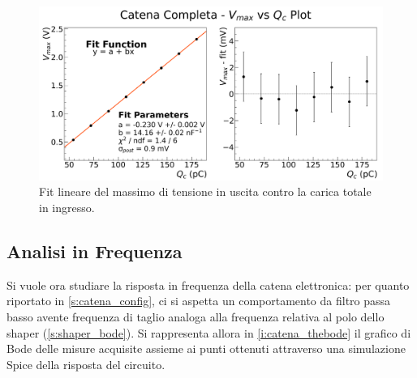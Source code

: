 \documentclass[a4paper,11pt]{article} %
\begin{document}
\begin{figure}[H] 
	\centering 
	\includegraphics[width=0.8\linewidth]{../Plots/Catena/catena_linearity2.png}
	\vspace{-10pt}
	\caption{\small Fit lineare del massimo di tensione in uscita contro la carica totale in ingresso.}
	\label{i:catena_linearity} 
\end{figure} 
\vspace{-7pt}


\subsection{Analisi in Frequenza}\label{s:catena_bode}

Si vuole ora studiare la risposta in frequenza della catena elettronica: per quanto riportato in
\autoref{s:catena_config}, ci si aspetta un comportamento da filtro passa basso avente frequenza di taglio analoga alla
frequenza relativa al polo dello shaper (\autoref{s:shaper_bode}). Si rappresenta allora in
\autoref{i:catena_thebode} il grafico di Bode delle misure acquisite assieme ai punti ottenuti attraverso una
simulazione Spice della risposta del circuito. 
\end{document}
